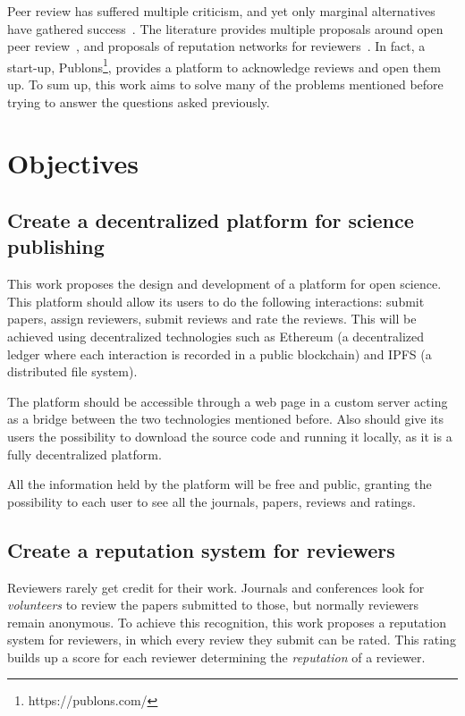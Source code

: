 Peer review has suffered multiple criticism, and yet only marginal alternatives
have gathered success~\cite{ware2008peer}. The literature provides multiple
proposals around open peer review~\cite{ford2013defining}, and proposals of
reputation networks for reviewers~\cite{frishauf2009reputation}. In fact, a
start-up, Publons\footnote{https://publons.com/}, provides a platform to
acknowledge reviews and open them up. To sum up, this work aims to solve many of
the problems mentioned before trying to answer the questions asked previously.

\section{Objectives}
\label{sec:objectives}
\subsection*{Create a decentralized platform for science publishing}

This work proposes the design and development of a platform for open science.
This platform should allow its users to do the following interactions: submit
papers, assign reviewers, submit reviews and rate the reviews. This will be
achieved using decentralized technologies such as Ethereum (a decentralized
ledger where each interaction is recorded in a public blockchain) and IPFS (a
distributed file system).

The platform should be accessible through a web page in a custom server acting
as a bridge between the two technologies mentioned before. Also should give its
users the possibility to download the source code and running it locally, as it
is a fully decentralized platform.

All the information held by the platform will be free and public, granting the
possibility to each user to see all the journals, papers, reviews and ratings.

\subsection*{Create a reputation system for reviewers}

Reviewers rarely get credit for their work. Journals and conferences look for
\emph{volunteers} to review the papers submitted to those, but normally
reviewers remain anonymous. To
achieve this recognition, this work proposes a reputation system for reviewers,
in which every review they submit can be rated. This rating builds up a score
for each reviewer determining the \emph{reputation} of a reviewer.

